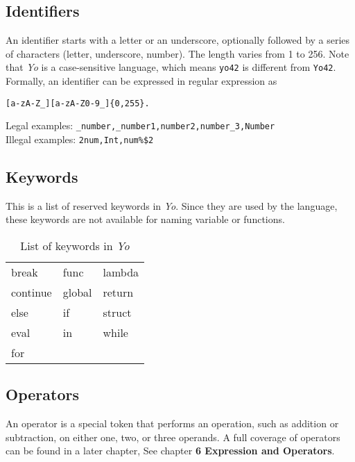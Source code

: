 \documentclass[12pt]{article}
\begin{document}
\subsection{Identifiers} %
\label{subsec:identifiers}
An identifier starts with a letter or an underscore, optionally followed by a series of characters (letter, underscore, number). The length varies from 1 to 256. Note that \textit{Yo} is a case-sensitive language, which means \texttt{yo42} is different from \texttt{Yo42}. \\
Formally, an identifier can be expressed in regular expression as \\
\begin{mdframed}[backgroundcolor=lightgray,hidealllines=true]
\begin{verbatim}
[a-zA-Z_][a-zA-Z0-9_]{0,255}.
\end{verbatim}
\end{mdframed}
Legal examples: \texttt{\_number,\_number1,number2,number\_3,Number}\\
Illegal examples: \texttt{2num,Int,num\%\$2}\\

\subsection{Keywords} %
This is a list of reserved keywords in \textit{Yo}. Since they are used by the language, these keywords are not available for naming variable or functions.\\
\begin{table}[htb!]
\centering
\caption{List of keywords in \textit{Yo}}
\begin{tabular}{lll}
break   & func   & lambda  \\
continue & global & return  \\
else  & if     & struct \\
eval   & in     & while  \\
for  & &
\end{tabular}
\end{table}

\subsection{Operators} %
An operator is a special token that performs an operation, such as addition or subtraction, on either one, two, or three operands. A full coverage of operators can be found in a later chapter, See chapter \textbf{6 Expression and Operators}.
\end{document}
